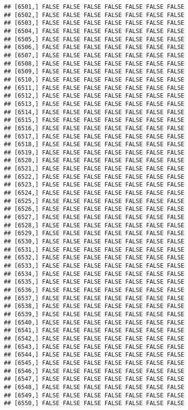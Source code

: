 \documentclass[
]{article}
\begin{document}
\begin{verbatim}
## [6501,] FALSE FALSE FALSE FALSE FALSE FALSE FALSE
## [6502,] FALSE FALSE FALSE FALSE FALSE FALSE FALSE
## [6503,] FALSE FALSE FALSE FALSE FALSE FALSE FALSE
## [6504,] FALSE FALSE FALSE FALSE FALSE FALSE FALSE
## [6505,] FALSE FALSE FALSE FALSE FALSE FALSE FALSE
## [6506,] FALSE FALSE FALSE FALSE FALSE FALSE FALSE
## [6507,] FALSE FALSE FALSE FALSE FALSE FALSE FALSE
## [6508,] FALSE FALSE FALSE FALSE FALSE FALSE FALSE
## [6509,] FALSE FALSE FALSE FALSE FALSE FALSE FALSE
## [6510,] FALSE FALSE FALSE FALSE FALSE FALSE FALSE
## [6511,] FALSE FALSE FALSE FALSE FALSE FALSE FALSE
## [6512,] FALSE FALSE FALSE FALSE FALSE FALSE FALSE
## [6513,] FALSE FALSE FALSE FALSE FALSE FALSE FALSE
## [6514,] FALSE FALSE FALSE FALSE FALSE FALSE FALSE
## [6515,] FALSE FALSE FALSE FALSE FALSE FALSE FALSE
## [6516,] FALSE FALSE FALSE FALSE FALSE FALSE FALSE
## [6517,] FALSE FALSE FALSE FALSE FALSE FALSE FALSE
## [6518,] FALSE FALSE FALSE FALSE FALSE FALSE FALSE
## [6519,] FALSE FALSE FALSE FALSE FALSE FALSE FALSE
## [6520,] FALSE FALSE FALSE FALSE FALSE FALSE FALSE
## [6521,] FALSE FALSE FALSE FALSE FALSE FALSE FALSE
## [6522,] FALSE FALSE FALSE FALSE FALSE FALSE FALSE
## [6523,] FALSE FALSE FALSE FALSE FALSE FALSE FALSE
## [6524,] FALSE FALSE FALSE FALSE FALSE FALSE FALSE
## [6525,] FALSE FALSE FALSE FALSE FALSE FALSE FALSE
## [6526,] FALSE FALSE FALSE FALSE FALSE FALSE FALSE
## [6527,] FALSE FALSE FALSE FALSE FALSE FALSE FALSE
## [6528,] FALSE FALSE FALSE FALSE FALSE FALSE FALSE
## [6529,] FALSE FALSE FALSE FALSE FALSE FALSE FALSE
## [6530,] FALSE FALSE FALSE FALSE FALSE FALSE FALSE
## [6531,] FALSE FALSE FALSE FALSE FALSE FALSE FALSE
## [6532,] FALSE FALSE FALSE FALSE FALSE FALSE FALSE
## [6533,] FALSE FALSE FALSE FALSE FALSE FALSE FALSE
## [6534,] FALSE FALSE FALSE FALSE FALSE FALSE FALSE
## [6535,] FALSE FALSE FALSE FALSE FALSE FALSE FALSE
## [6536,] FALSE FALSE FALSE FALSE FALSE FALSE FALSE
## [6537,] FALSE FALSE FALSE FALSE FALSE FALSE FALSE
## [6538,] FALSE FALSE FALSE FALSE FALSE FALSE FALSE
## [6539,] FALSE FALSE FALSE FALSE FALSE FALSE FALSE
## [6540,] FALSE FALSE FALSE FALSE FALSE FALSE FALSE
## [6541,] FALSE FALSE FALSE FALSE FALSE FALSE FALSE
## [6542,] FALSE FALSE FALSE FALSE FALSE FALSE FALSE
## [6543,] FALSE FALSE FALSE FALSE FALSE FALSE FALSE
## [6544,] FALSE FALSE FALSE FALSE FALSE FALSE FALSE
## [6545,] FALSE FALSE FALSE FALSE FALSE FALSE FALSE
## [6546,] FALSE FALSE FALSE FALSE FALSE FALSE FALSE
## [6547,] FALSE FALSE FALSE FALSE FALSE FALSE FALSE
## [6548,] FALSE FALSE FALSE FALSE FALSE FALSE FALSE
## [6549,] FALSE FALSE FALSE FALSE FALSE FALSE FALSE
## [6550,] FALSE FALSE FALSE FALSE FALSE FALSE FALSE

\end{verbatim}
\end{document}
